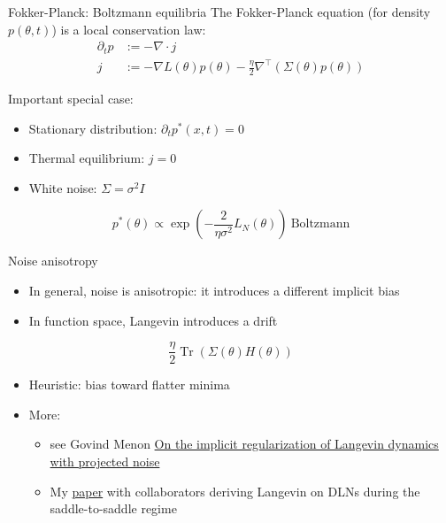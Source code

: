 \documentclass[aspectratio=169]{beamer}
\begin{document}
\begin{frame}{Fokker-Planck: Boltzmann equilibria}
  \small
  The Fokker-Planck equation (for density $p(\theta,t)$) is a local conservation law:
  \[
    \begin{aligned}
      \partial_t p & := - \nabla\cdot j \\
      j &:=- \nabla L(\theta)p(\theta) - \frac{\eta}{2}\nabla^\top\left(\Sigma(\theta)p(\theta)\right)
    \end{aligned}
  \]

  Important special case:
  \begin{itemize}
    \item Stationary distribution: $\partial_tp^{\ast}(x,t) = 0$
    \item Thermal equilibrium: $j=0$
    \item White noise: $\Sigma=\sigma^2 I$
  \end{itemize}

  \[
    p^{\ast}(\theta) \propto \exp\left(-\frac{2}{\eta\sigma^2}L_N(\theta)\right) \ \text{Boltzmann}
  \]
\end{frame}

\begin{frame}{Noise anisotropy}
  \small
  \begin{itemize}
    \item In general, noise is anisotropic: it introduces a different implicit bias
    \item In function space, Langevin introduces a drift
  \end{itemize}

  \[
    \frac{\eta}{2}\operatorname{Tr}(\Sigma(\theta)H(\theta))
  \]

  \begin{itemize}
    \item Heuristic: bias toward flatter minima
    \item More:
      \begin{itemize}
        \item see Govind Menon \href{https://arxiv.org/abs/2602.12257}{On the implicit regularization of Langevin dynamics with projected noise}
        \item My \href{https://arxiv.org/html/2604.06366v1}{paper} with collaborators deriving Langevin on DLNs during the saddle-to-saddle regime
      \end{itemize}
  \end{itemize}
\end{frame}
\end{document}

